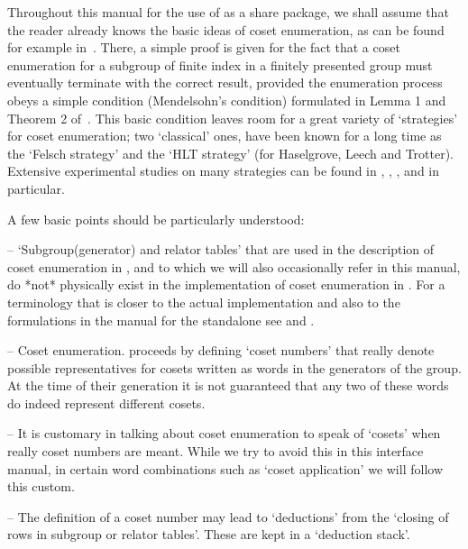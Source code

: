 
Throughout  this  manual for  the  use of  {\ACE}  as  a {\GAP}  share
package, we shall assume that the reader already knows the basic ideas
of  coset enumeration, as  can be  found for  example in~\cite{Neu82}.
There, a simple  proof is given for the fact  that a coset enumeration
for  a subgroup of  finite index  in a  finitely presented  group must
eventually terminate with the correct result, provided the enumeration
process obeys  a simple condition  (Mendelsohn's condition) formulated
in Lemma 1 and Theorem 2 of~\cite{Neu82}.  This basic condition leaves
room for a great variety of \lq strategies' for coset enumeration; two
\lq classical' ones, have been known for a long time as the \lq Felsch
strategy'  and  the  \lq  HLT  strategy' (for  Haselgrove,  Leech  and
Trotter).  Extensive experimental  studies on  many strategies  can be
found in  \cite{CDHW73}, \cite{Hav91}, \cite{HR99a},  and \cite{HR99b}
in particular.

A few basic points  should be particularly understood:

\beginlist

\item{--} \lq Subgroup(generator) and relator tables' that are used in
the description of coset enumeration  in \cite{Neu82}, and to which we
will  also occasionally  refer in  this manual,   do  *not* physically
exist    in the implementation of  coset enumeration in {\ACE}.  For a
terminology that  is closer to  the actual implementation and  also to
the  formulations  in  the   manual  for  the  {\ACE}  standalone  see
\cite{CDHW73} and \cite{Hav91}.

\item{--} Coset  enumeration. proceeds by defining  \lq coset numbers'
that  really denote  possible  representatives for  cosets written  as
words in the generators  of the group. At the  time of their generation
it is not  guaranteed that any two of these  words do indeed represent
different cosets.

\item{--} It is customary in  talking about coset enumeration to speak
of \lq  cosets' when really coset  numbers are meant. While  we try to
avoid this in this interface manual, in certain word combinations such
as \lq coset application' we will follow this custom.

\item{--} The definition of a coset number may lead to \lq deductions'
from the \lq closing of rows in subgroup or relator tables'. These are
kept in a \lq deduction stack'.

